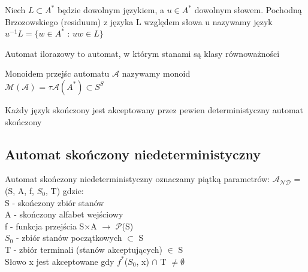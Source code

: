 \documentclass[12pt]{article}
\begin{document}
    	\begin{definition}
    	Niech $L \subset  A^{*}$ będzie dowolnym językiem, a $u \in A^{*}$ dowolnym słowem.
	Pochodną Brzozowskiego (residuum) z języka L względem słowa u nazywamy język \\
	$u^{-1}L = \{w \in A^{*}$  :  $uw \in L \}$
    	\end{definition}

    	\begin{definition}
    	Automat ilorazowy to automat, w którym stanami są klasy równoważności
    	\end{definition}

    	\begin{definition}
    	Monoidem przejśc automatu $\mathcal{A}$ nazywamy monoid \\
    	$\mathcal{M(A)}$ = $\tau \mathcal{A}(A^*) \subset S^{S}$ 
    	\end{definition}

    	\begin{definition}
    	Każdy język skończony jest akceptowany przez pewien deterministyczny automat skończony
    	\end{definition}

    \subsection{Automat skończony niedeterministyczny}
	\begin{definition}
    		Automat skończony niedeterministyczny oznaczamy piątką parametrów: $\mathcal{A_{ND}}$ = (S, A, f, $S_{0}$, T) gdzie: \\
    			S - skończony zbiór stanów \\
    			A - skończony alfabet wejściowy \\
    			f - funkcja przejścia S$\times$A $\rightarrow$ $\mathcal{P}$(S) \\
    			$S_{0}$ - zbiór stanów początkowych $\subset$ S\\
    			T - zbiór terminali (stanów akceptujących) $\in$ S \\

	Słowo x jest akceptowane gdy $f^{*}$($S_{0}$, x) $\cap$ T $\neq \emptyset$
    \end{definition}
\end{document}
